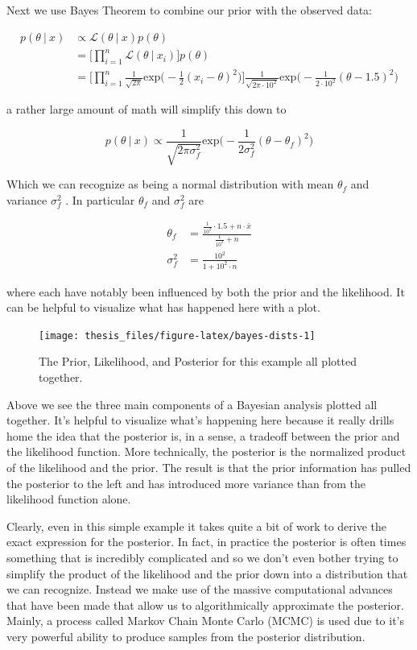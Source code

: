 \documentclass[12pt,twoside]{reedthesis}
\begin{document}
Next we use Bayes Theorem to combine our prior with the observed data:

\[
\begin{aligned}
p(\theta \ | \ x) &\propto \mathcal{L}(\theta \ | \ x)p(\theta) \\
&= \bigg[\prod_{i=1}^n\mathcal{L}(\theta \ | \ x_i)\bigg]p(\theta) \\
&= \bigg[\prod_{i=1}^n\frac{1}{\sqrt{2\pi}}\text{exp}\bigg(-\frac{1}{2}(x_i - \theta )^2\bigg)\bigg]\frac{1}{\sqrt{2\pi\cdot10^2}}\text{exp}\bigg(-\frac{1}{2\cdot10^2}(\theta - 1.5)^2\bigg) 
\end{aligned}
\]

a rather large amount of math will simplify this down to

\[
p(\theta \ | \ x) \propto \frac{1}{\sqrt{2\pi\sigma_f^2}}\text{exp}\bigg(-\frac{1}{2\sigma_f^2}(\theta - \theta_f)^2\bigg)
\]

Which we can recognize as being a normal distribution with mean \(\theta_f\) and variance \(\sigma^2_f\) . In particular \(\theta_f\) and \(\sigma^2_f\) are

\[
\begin{aligned}
\theta_f &= \frac{\frac{1}{10^2}\cdot1.5 + n\cdot \bar{x}}{\frac{1}{10^2} + n} \\
\sigma^2_f &= \frac{10^2}{1 + 10^2\cdot n}
\end{aligned}
\]

where each have notably been influenced by both the prior and the likelihood. It can be helpful to visualize what has happened here with a plot.
\begin{figure}

{\centering \texttt{[image: thesis\_files/figure-latex/bayes-dists-1]} 

}

\caption{The Prior, Likelihood, and Posterior for this example all plotted together.}\label{fig:bayes-dists}
\end{figure}
Above we see the three main components of a Bayesian analysis plotted all together. It's helpful to visualize what's happening here because it really drills home the idea that the posterior is, in a sense, a tradeoff between the prior and the likelihood function. More technically, the posterior is the normalized product of the likelihood and the prior. The result is that the prior information has pulled the posterior to the left and has introduced more variance than from the likelihood function alone.

Clearly, even in this simple example it takes quite a bit of work to derive the exact expression for the posterior. In fact, in practice the posterior is often times something that is incredibly complicated and so we don't even bother trying to simplify the product of the likelihood and the prior down into a distribution that we can recognize. Instead we make use of the massive computational advances that have been made that allow us to algorithmically approximate the posterior. Mainly, a process called Markov Chain Monte Carlo (MCMC) is used due to it's very powerful ability to produce samples from the posterior distribution.
\end{document}
